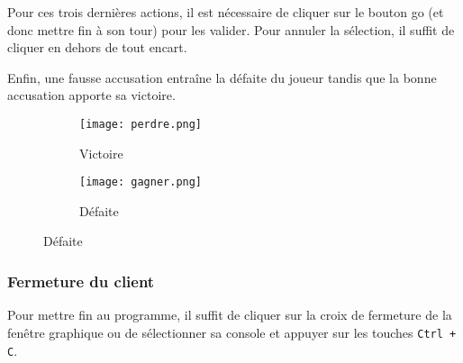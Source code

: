 Pour ces trois dernières actions, il est nécessaire de cliquer sur le bouton go (et donc mettre fin à son tour) pour les valider. Pour annuler la sélection, il suffit de cliquer en dehors de tout encart.

Enfin, une fausse accusation entraîne la défaite du joueur tandis que la bonne accusation apporte sa victoire.

\begin{figure}[H]
     \centering
     \begin{subfigure}{.45\linewidth}
         \centering
         \texttt{[image: perdre.png]}
         \caption{Victoire}
		\label{fig:victoire}
     \end{subfigure}
     \hspace{1em}
     \begin{subfigure}{.45\linewidth}
         \centering
         \texttt{[image: gagner.png]}
         \caption{Défaite}
		\label{fig:defaite}
     \end{subfigure}
\end{figure}

\subsubsection{Fermeture du client}

Pour mettre fin au programme, il suffit de cliquer sur la croix de fermeture de la fenêtre graphique ou de sélectionner sa console et appuyer sur les touches \verb|Ctrl + C|.
